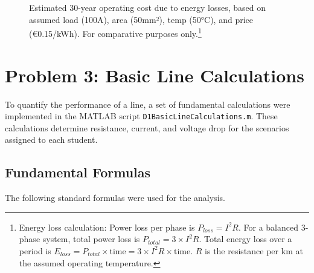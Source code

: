 \documentclass[12pt, a4paper]{article}
\begin{document}
\begin{figure}[h!]
\centering
\caption{Estimated 30-year operating cost due to energy losses, based on assumed load (100A), area (50mm²), temp (50°C), and price (€0.15/kWh). For comparative purposes only.\protect\footnote{Energy loss calculation: Power loss per phase is $P_{loss} = I^2 R$. For a balanced 3-phase system, total power loss is $P_{total} = 3 \times I^2 R$. Total energy loss over a period is $E_{loss} = P_{total} \times \text{time} = 3 \times I^2 R \times \text{time}$. $R$ is the resistance per km at the assumed operating temperature.}}
\end{figure}
\newpage
\section{Problem 3: Basic Line Calculations}
To quantify the performance of a line, a set of fundamental calculations were implemented in the MATLAB script \texttt{D1BasicLineCalculations.m}. These calculations determine resistance, current, and voltage drop for the scenarios assigned to each student.

\subsection{Fundamental Formulas}
The following standard formulas were used for the analysis.
\end{document}
